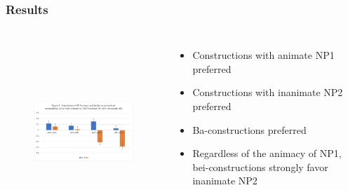 \documentclass{beamer}
\begin{document}
\begin{frame}
\frametitle{Results}
\begin{columns}[c] %

\begin{figure}
\includegraphics[width=8cm,height=7cm,keepaspectratio]{SHF_Presentation/Exp2.png}
\end{figure}


{\footnotesize
\begin{itemize}
    \item<1-> Constructions with animate NP1 preferred
    \item<2-> Constructions with inanimate NP2 preferred 
    \item<3-> Ba-constructions preferred
    \item<4-> Regardless of the animacy of NP1, bei-constructions strongly favor inanimate NP2
\end{itemize}
}

\end{columns}
\end{frame}




\end{document}
